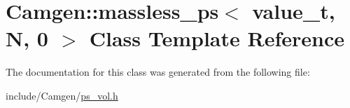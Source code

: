 \hypertarget{a00352}{\section{Camgen\-:\-:massless\-\_\-ps$<$ value\-\_\-t, N, 0 $>$ Class Template Reference}
\label{a00352}
}


The documentation for this class was generated from the following file\-:\begin{DoxyCompactItemize}
\item 
include/\-Camgen/\hyperlink{a00719}{ps\-\_\-vol.\-h}\end{DoxyCompactItemize}

